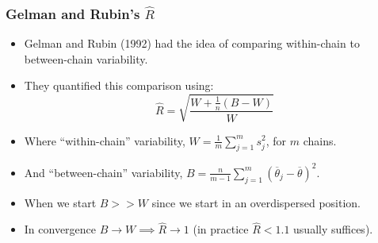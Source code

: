 \documentclass[handout]{beamer}
\begin{document}
\begin{frame}
\frametitle{Gelman and Rubin's $\hat{R}$}

\begin{itemize}
\item<2-> Gelman and Rubin (1992) had the idea of comparing within-chain to between-chain variability.
\item<3-> They quantified this comparison using:
\begin{equation}
\hat{R} = \sqrt{\frac{W + \frac{1}{n} (B - W)}{W}}
\end{equation}
\item<4-> Where ``within-chain'' variability, $W = \frac{1}{m} \sum\limits_{j=1}^{m} s_j^2$, for $m$ chains.
\item<5-> And ``between-chain'' variability, $B = \frac{n}{m-1} \sum\limits_{j=1}^{m} (\overline{\theta}_j - \overline{\theta})^2$.
\item<6-> When we start $B >> W$ since we start in an overdispersed position.
\item<7-> In convergence $B\rightarrow W \implies \hat{R}\rightarrow 1$ (in practice $\hat{R}<1.1$ usually suffices).
\end{itemize}

\end{frame}
\end{document}
